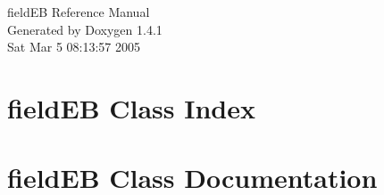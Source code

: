 \documentclass[a4paper]{book}
\begin{document}
\begin{titlepage}
\vspace*{7cm}
\begin{center}
{\Large field\-EB Reference Manual}\\
\vspace*{1cm}
{\large Generated by Doxygen 1.4.1}\\
\vspace*{0.5cm}
{\small Sat Mar 5 08:13:57 2005}\\
\end{center}
\end{titlepage}
\clearemptydoublepage
{}
\tableofcontents
\clearemptydoublepage
{}
\chapter{field\-EB Class Index}

\chapter{field\-EB Class Documentation}











\printindex
\end{document}
